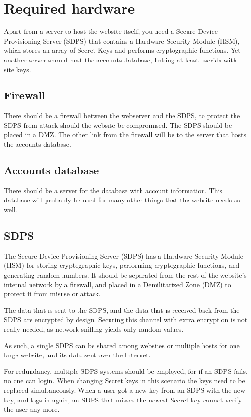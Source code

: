\section{Required hardware}
Apart from a server to host the website itself,
you need a Secure Device Provisioning Server (SDPS)
that contains a Hardware Security Module (HSM),
which stores an array of Secret Keys and performs cryptographic functions.
Yet another server should host the accounts database, linking at least userids with site keys.

\subsection{Firewall}
There should be a firewall between the webserver and the SDPS,
to protect the SDPS from attack should the website be compromised.
The SDPS should be placed in a DMZ.
The other link from the firewall will be to the server that hosts the accounts database.

\subsection{Accounts database}
There should be a server for the database with account information.
This database will probably be used for many other things that the website needs as well.

\subsection{SDPS}
\label{sec:SDPS}
The Secure Device Provisioning Server (SDPS) has a Hardware Security Module (HSM)
for storing cryptographic keys, performing cryptographic functions, and generating random numbers.
It should be separated from the rest of the website's internal network by a firewall,
and placed in a Demilitarized Zone (DMZ) to protect it from misuse or attack.
\par
The data that is sent to the SDPS, and the data that is received back from the SDPS are encrypted by design.
Securing this channel with extra encryption is not really needed, as network sniffing yields only random values.
\par
As such, a single SDPS can be shared among websites or multiple hosts for one large website, and its data sent over the Internet.
\par
For redundancy, multiple SDPS systems should be employed, for if an SDPS fails, no one can login.
When changing Secret keys in this scenario
the keys need to be replaced simultaneously.
When a user got a new key from an SDPS with the new key, and logs in again, an SDPS that misses the newest Secret key cannot verify the user any more.

